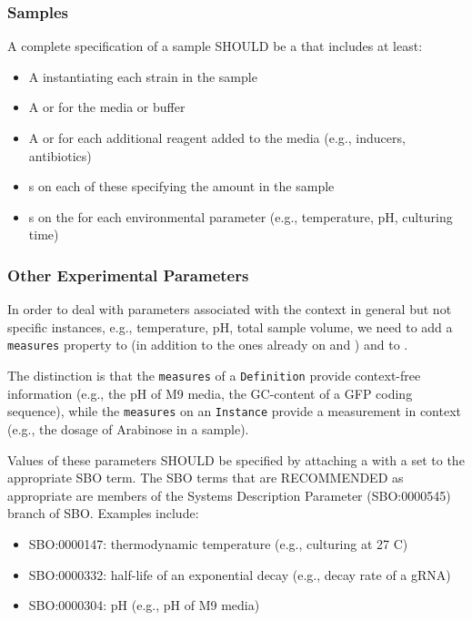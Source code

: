 \subsubsection{Samples}

A complete specification of a sample SHOULD be a  that includes at least:
\begin{itemize}
\item A  instantiating each strain in the sample
\item A  or  for the media or buffer
\item A  or  for each additional reagent added to the media (e.g., inducers, antibiotics)
\item {}s on each of these specifying the amount in the sample
\item {}s on the  for each environmental parameter (e.g., temperature, pH, culturing time)
\end{itemize}

\subsubsection{Other Experimental Parameters}

In order to deal with parameters associated with the context in general but not specific instances, e.g., temperature, pH, total sample volume, we need to add a \texttt{measures} property to  (in addition to the ones already on  and ) and to .

The distinction is that the \texttt{measures} of a \texttt{Definition} provide context-free information (e.g., the pH of M9 media, the GC-content of a GFP coding sequence), while the \texttt{measures} on an \texttt{Instance} provide a measurement in context (e.g., the dosage of Arabinose in a sample).

Values of these parameters SHOULD be specified by attaching a  with a  set to the appropriate SBO term. The SBO terms that are RECOMMENDED as appropriate are members of the Systems Description Parameter (SBO:0000545) branch of SBO. Examples include:
\begin{itemize}
\item SBO:0000147: thermodynamic temperature (e.g., culturing at 27 C)
\item SBO:0000332: half-life of an exponential decay (e.g., decay rate of a gRNA)
\item SBO:0000304: pH (e.g., pH of M9 media)
\end{itemize}
